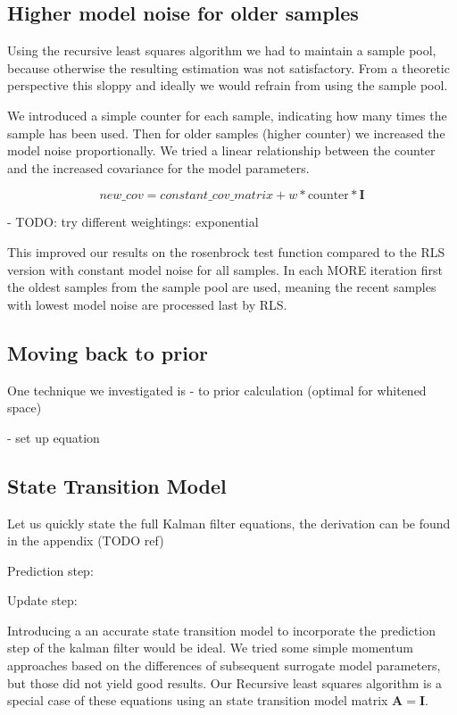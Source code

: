 \subsection{Higher model noise for older samples}
Using the recursive least squares algorithm we had to maintain a sample
pool, because otherwise the resulting estimation was not
satisfactory. From a theoretic perspective this sloppy and ideally we
would refrain from using the sample pool.

We introduced a simple counter for each sample, indicating how many times
the sample has been used.
Then for older samples (higher counter) we increased the model
noise proportionally.
We tried a linear relationship between the counter and
the increased covariance for the model parameters.

$$ new\_cov = constant\_cov\_matrix + w * \text{counter} * \mathbf{I} $$

- TODO: try different weightings: exponential

This improved our results on the rosenbrock test function compared
to the RLS version with constant model noise for all samples.
In each MORE iteration first the oldest samples from the sample pool
are used, meaning the recent samples with lowest model noise are
processed last by RLS.

\subsection{Moving back to prior}
One technique we investigated is 
- to prior calculation (optimal for whitened space)

- set up equation

\subsection{State Transition Model}
Let us quickly state the full Kalman filter equations, the
derivation can be found in the appendix (TODO ref)

Prediction step:

Update step:

Introducing a an accurate state transition model to incorporate the
prediction step of the kalman filter would be ideal.
We tried some simple momentum approaches based on the differences of
subsequent surrogate model parameters, but those did not yield
good results.
Our Recursive least squares algorithm is a special case of these
equations using an state transition model matrix $\mathbf{A} = \mathbf{I}$.
